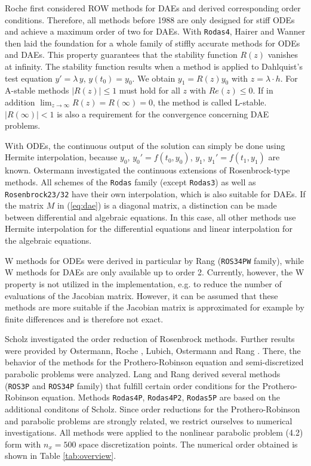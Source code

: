 \documentclass{juliacon}
\begin{document}
Roche \cite{roche} first considered ROW methods for DAEs and derived corresponding order conditions. 
Therefore, all methods before 1988 are only designed for stiff ODEs and achieve a maximum order of two for DAEs.
With \verb|Rodas4|, Hairer and Wanner \cite{hairer} then laid the foundation for a whole family of stiffly accurate methods for ODEs and DAEs. 
This property guarantees that the stability function $R(z)$ vanishes at infinity.
The stability function results when a method is applied to Dahlquist's test equation $y' = \lambda \, y$, $y(t_0)=y_0$. We obtain
$y_1 = R(z) y_0$ with $z = \lambda \cdot h$.
For A-stable methods $|R(z)| \leq 1$ must hold for all $z$ with $Re(z) \leq 0$. If in addition $\lim_{z \to \infty} R(z) = R(\infty)=0$, the method is called L-stable.
$|R(\infty)| < 1$ is also a requirement for the convergence concerning DAE problems.

With ODEs, the continuous output of the solution can simply be done using Hermite interpolation, because $y_0$, $y_0' = f(t_0,y_0)$, $y_1$, $y_1'=f(t_1,y_1)$ are known.
Ostermann \cite{ostermann} investigated the continuous extensions of Rosenbrock-type methods. All schemes of the \verb|Rodas| family (except \verb|Rodas3|) as well as  
\verb|Rosenbrock23/32| have their own interpolation, which is also suitable for DAEs.
If the matrix $M$ in (\ref{eq:dae}) is a diagonal matrix, a distinction can be made between differential and algebraic equations. 
In this case, all other methods use Hermite interpolation for the differential equations and linear interpolation for the algebraic equations.

W methods for ODEs were derived in particular by Rang (\verb|ROS34PW| family), while W methods for DAEs are only available up to order 2. 
Currently, however, the W property is not utilized in the implementation, e.g. to reduce the number of evaluations of the Jacobian matrix.
However, it can be assumed that these methods are more suitable if the Jacobian matrix is approximated for example by finite differences and is therefore not exact.

Scholz \cite{scholz} investigated the order reduction of Rosenbrock methods. Further results were provided by Ostermann, Roche \cite{oro}, 
Lubich, Ostermann \cite{luos} and Rang \cite{rang2}.
There, the behavior of the methods for the Prothero-Robinson equation and semi-discretized parabolic problems were analyzed. 
Lang and Rang derived several methods (\verb|ROS3P| and \verb|ROS34P| family) that fulfill certain order conditions for the Prothero-Robinson equation. 
Methods \verb|Rodas4P|, \verb|Rodas4P2|, \verb|Rodas5P| are based on the additional conditons of Scholz.
Since order reductions for the Prothero-Robinson and parabolic problems are strongly related, we restrict ourselves to numerical investigations.
All methods were applied to the nonlinear parabolic problem (4.2) form \cite{rodas5p} with $n_x = 500$ space discretization points.
The numerical order obtained is shown in Table \ref{tab:overview}.
\end{document}

